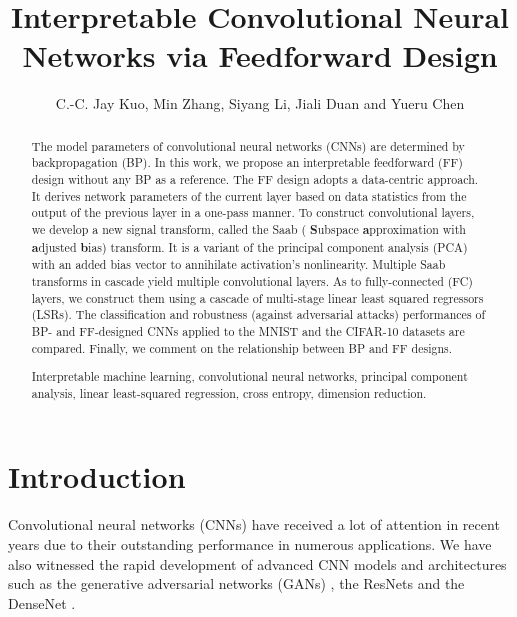 \documentclass[preprint,12pt]{elsarticle}
\begin{document}
\begin{frontmatter}

\title{Interpretable Convolutional Neural Networks via Feedforward Design}

\author{C.-C. Jay Kuo, Min Zhang, Siyang Li, Jiali Duan and Yueru Chen}
\address{University of Southern California, Los Angeles, CA 90089-2564, USA}

\begin{abstract}

The model parameters of convolutional neural networks (CNNs) are
determined by backpropagation (BP).  In this work, we propose an
interpretable feedforward (FF) design without any BP as a reference.
The FF design adopts a data-centric approach. It derives network
parameters of the current layer based on data statistics from the output
of the previous layer in a one-pass manner. To construct convolutional
layers, we develop a new signal transform, called the Saab ({\bf
S}ubspace {\bf a}pproximation with {\bf a}djusted {\bf b}ias) transform.
It is a variant of the principal component analysis (PCA) with an added
bias vector to annihilate activation's nonlinearity.  Multiple Saab
transforms in cascade yield multiple convolutional layers.  As to
fully-connected (FC) layers, we construct them using a cascade of
multi-stage linear least squared regressors (LSRs). The classification
and robustness (against adversarial attacks) performances of BP- and
FF-designed CNNs applied to the MNIST and the CIFAR-10 datasets are
compared.  Finally, we comment on the relationship between BP and FF
designs. 

\begin{keyword}
Interpretable machine learning, convolutional neural networks, principal
component analysis, linear least-squared regression, cross entropy,
dimension reduction. 
\end{keyword}
\end{abstract}

\end{frontmatter}

\section{Introduction}\label{sec:introduction}

Convolutional neural networks (CNNs) have received a lot of attention in
recent years due to their outstanding performance in numerous
applications.  We have also witnessed the rapid development of advanced
CNN models and architectures such as the generative adversarial networks
(GANs) \cite{goodfellow2014generative}, the ResNets \cite{He_2016_CVPR}
and the DenseNet \cite{huang2017densely}. 
\end{document}
